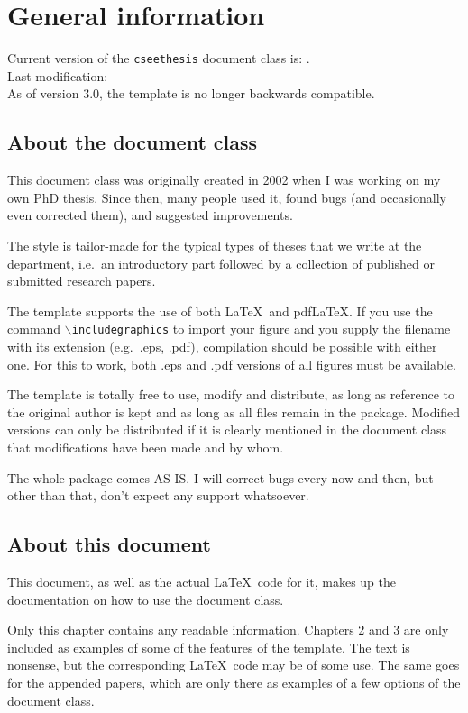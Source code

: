 \section{General information}
Current version of the \texttt{cseethesis} document class is: \classversion.\\
Last modification: \classdate\\

\noindent As of version 3.0, the template is no longer backwards compatible.

\subsection{About the document class}
This document class was originally created in 2002 when I was working on my own PhD thesis. Since then, many people used it, found bugs (and occasionally even corrected them), and suggested improvements.

The style is tailor-made for the typical types of theses that we write at the department, i.e.\ an introductory part followed by a collection of published or submitted research papers. 

The template supports the use of both \LaTeX\ and pdfLaTeX. If you use the command \texttt{$\backslash$includegraphics} to import your figure and you supply the filename with its extension (e.g.\ .eps, .pdf), compilation should be possible with either one. For this to work, both .eps and .pdf versions of all figures must be available.

The template is totally free to use, modify and distribute, as long as reference to the original author is kept and as long as all files remain in the package. Modified versions can only be distributed if it is clearly mentioned in the document class that modifications have been made and by whom.

The whole package comes AS IS. I will correct bugs every now and then, but other than that, don't expect any support whatsoever.


\subsection{About this document}
This document, as well as the actual \LaTeX\ code for it, makes up the documentation on how to use the document class.

Only this chapter contains any readable information. Chapters 2 and 3 are only included as examples of some of the features of the template. The text is nonsense, but the corresponding \LaTeX\ code may be of some use. The same goes for the appended papers, which are only there as examples of a few options of the document class.


